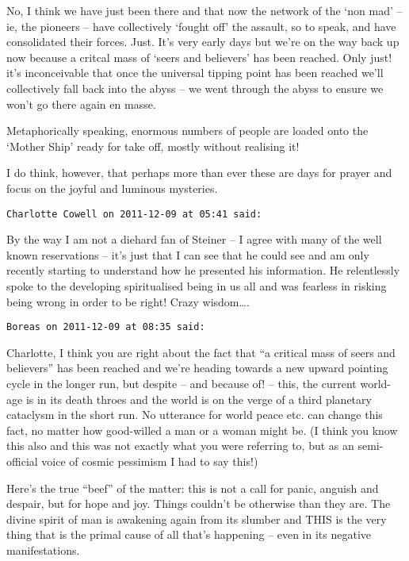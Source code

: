 \begin{footnotesize}
\begin{sffamily}
No, I think we have just been there and that now the network of the `non mad’ – ie, the pioneers – have collectively `fought off' the assault, so to speak, and have consolidated their forces. Just. It's very early days but we're on the way back up now because a critcal mass of `seers and believers' has been reached. Only just! it's inconceivable that once the universal tipping point has been reached we'll collectively fall back into the abyss – we went through the abyss to ensure we won't go there again en masse. 

Metaphorically speaking, enormous numbers of people are loaded onto the `Mother Ship' ready for take off, mostly without realising it!

I do think, however, that perhaps more than ever these are days for prayer and focus on the joyful and luminous mysteries.


\hfill

\texttt{Charlotte Cowell on 2011-12-09 at 05:41 said: }

By the way I am not a diehard fan of Steiner – I agree with many of the well known reservations – it's just that I can see that he could see and am only recently starting to understand how he presented his information. He relentlessly spoke to the developing spiritualised being in us all and was fearless in risking being wrong in order to be right! Crazy wisdom….


\hfill

\texttt{Boreas on 2011-12-09 at 08:35 said: }

Charlotte, I think you are right about the fact that ``a critical mass of seers and believers'' has been reached and we're heading towards a new upward pointing cycle in the longer run, but despite – and because of! – this, the current world-age is in its death throes and the world is on the verge of a third planetary cataclysm in the short run. No utterance for world peace etc. can change this fact, no matter how good-willed a man or a woman might be. (I think you know this also and this was not exactly what you were referring to, but as an semi-official voice of cosmic pessimism I had to say this!)

Here's the true ``beef'' of the matter: this is not a call for panic, anguish and despair, but for hope and joy. Things couldn't be otherwise than they are. The divine spirit of man is awakening again from its slumber and THIS is the very thing that is the primal cause of all that's happening – even in its negative manifestations.



\end{sffamily}
\end{footnotesize}
